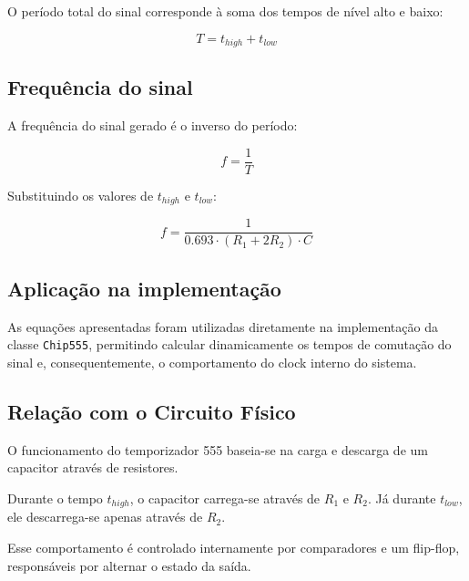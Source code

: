 \documentclass[12pt,a4paper]{article}
\begin{document}
O período total do sinal corresponde à soma dos tempos de nível alto e baixo:

\begin{equation}
T = t_{high} + t_{low}
\end{equation}

\subsection{Frequência do sinal}

A frequência do sinal gerado é o inverso do período:

\begin{equation}
f = \frac{1}{T}
\end{equation}

Substituindo os valores de $t_{high}$ e $t_{low}$:

\begin{equation}
f = \frac{1}{0.693 \cdot (R_1 + 2R_2) \cdot C}
\end{equation}

\subsection{Aplicação na implementação}

As equações apresentadas foram utilizadas diretamente na implementação da classe \texttt{Chip555}, permitindo calcular dinamicamente os tempos de comutação do sinal e, consequentemente, o comportamento do clock interno do sistema.



\subsection{Relação com o Circuito Físico}

O funcionamento do temporizador 555 baseia-se na carga e descarga de um capacitor através de resistores.

Durante o tempo \(t_{high}\), o capacitor carrega-se através de \(R_1\) e \(R_2\). Já durante \(t_{low}\), ele descarrega-se apenas através de \(R_2\).

Esse comportamento é controlado internamente por comparadores e um flip-flop, responsáveis por alternar o estado da saída.
\end{document}
